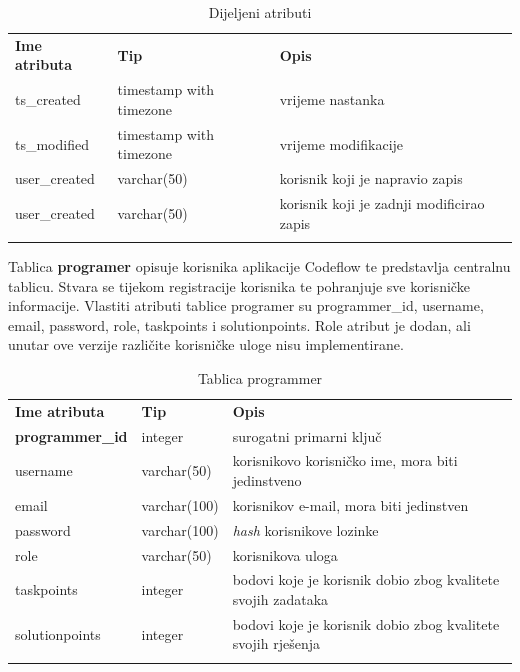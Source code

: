 \documentclass[times, utf8, zavrsni, numeric]{fer}
\begin{document}
		\begin{table}[H]
			\caption{Dijeljeni atributi}
			\label{tbl:dij-attr}
			\centering
			\begin{tabu} to \textwidth {XXX}
				\tabucline[1.75pt]{-}
				\textbf{Ime atributa} & \textbf{Tip} & \textbf{Opis}\\				
				\tabucline[1.75pt]{-}
				ts\_created & timestamp with timezone & vrijeme nastanka\\ \hline
				ts\_modified & timestamp with timezone & vrijeme modifikacije\\ \hline
				user\_created & varchar(50) & korisnik koji je napravio zapis\\ \hline
				user\_created & varchar(50) & korisnik koji je zadnji modificirao zapis\\
				\tabucline[1.75pt]{-}
			\end{tabu}
		\end{table}
		
		Tablica \textbf{programer} opisuje korisnika aplikacije Codeflow te predstavlja centralnu tablicu. Stvara se tijekom registracije korisnika te pohranjuje sve korisničke informacije. Vlastiti atributi tablice programer su programmer\_id, username, email, password, role, taskpoints i solutionpoints. Role atribut je dodan, ali unutar ove verzije različite korisničke uloge nisu implementirane.
		\begin{table}[H]
			\caption{Tablica programmer}
			\label{tbl:programmer}
			\centering
			\begin{tabu} to \textwidth {XXX}
				\tabucline[1.75pt]{-}
				\textbf{Ime atributa} & \textbf{Tip} & \textbf{Opis}\\ 				
				\tabucline[1.75pt]{-}
				\textbf{programmer\_id} & integer & surogatni primarni ključ\\ \hline
				username & varchar(50) & korisnikovo korisničko ime, mora biti jedinstveno\\ \hline
				email & varchar(100) & korisnikov e-mail, mora biti jedinstven\\ \hline
				password & varchar(100) & \textit{hash} korisnikove lozinke\\ \hline
				role & varchar(50) & korisnikova uloga\\ \hline
				taskpoints & integer & bodovi koje je korisnik dobio zbog kvalitete svojih zadataka\\ \hline
				solutionpoints & integer &  bodovi koje je korisnik dobio zbog kvalitete svojih rješenja\\
				\tabucline[1.75pt]{-}
			\end{tabu}
		\end{table}
		
\end{document}
